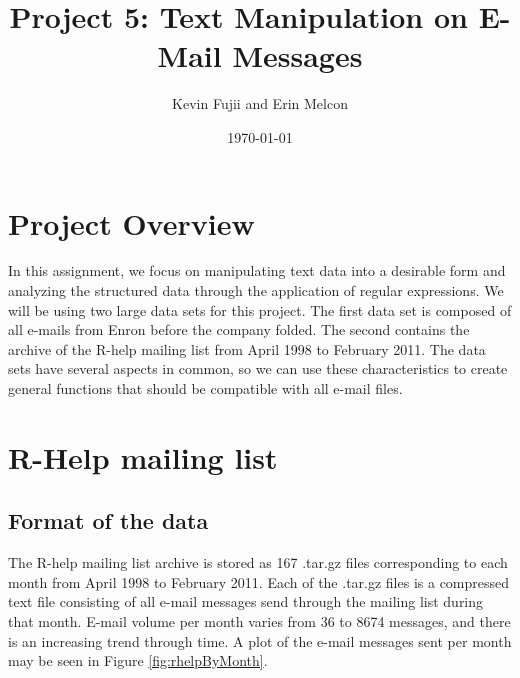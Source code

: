 \documentclass[12pt, a4paper, oneside]{amsart}
\title{Project 5: Text Manipulation on E-Mail Messages}
\author{Kevin Fujii and Erin Melcon}
\date{\today}
\begin{document}
\maketitle

\section*{Project Overview}

In this assignment, we focus on manipulating text data into a desirable form and analyzing the structured data through the application of regular expressions.  We will be using two large data sets for this project.  The first data set is composed of all e-mails from Enron before the company folded.  The second contains the archive of the R-help mailing list from April 1998 to February 2011.  The data sets have several aspects in common, so we can use these characteristics to create general functions that should be compatible with all e-mail files.

\section*{R-Help mailing list}

\subsection{Format of the data}

The R-help mailing list archive is stored as 167 .tar.gz files corresponding to each month from April 1998 to February 2011.  Each of the .tar.gz files is a compressed text file consisting of all e-mail messages send through the mailing list during that month.  E-mail volume per month varies from 36 to 8674 messages, and there is an increasing trend through time.  A plot of the e-mail messages sent per month may be seen in Figure \ref{fig:rhelpByMonth}.
\end{document}

